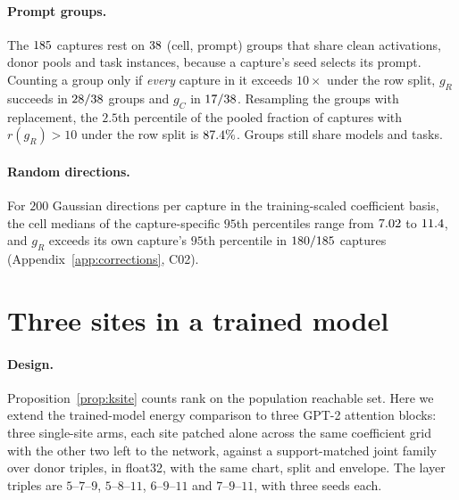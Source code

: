 \paragraph{Prompt groups.} The $185$ captures rest on $38$ (cell, prompt) groups that share clean
activations, donor pools and task instances, because a capture's seed selects its prompt. Counting a group only if \emph{every} capture in it exceeds
$10\times$ under the row split, $g_R$ succeeds in $28/38$ groups and $g_C$ in $17/38$.
Resampling the groups with replacement, the $2.5$th percentile of the pooled fraction of captures with
$r(g_R)>10$ under the row split is $87.4\%$. Groups still share models and tasks.

\paragraph{Random directions.} For $200$ Gaussian directions per capture in the training-scaled coefficient basis, the
cell medians of the capture-specific $95$th percentiles range from $7.02$ to $11.4$, and $g_R$
exceeds its own capture's $95$th percentile in $180/185$ captures (Appendix~\ref{app:corrections}, C02).

\section{Three sites in a trained model}
\label{app:three}

\paragraph{Design.} Proposition~\ref{prop:ksite} counts rank on the population reachable set. Here we extend the
trained-model energy comparison to three GPT-2 attention blocks: three single-site arms, each site patched alone across the same
coefficient grid with the other two left to the network, against a support-matched joint family over donor triples,
in float32, with the same chart, split and envelope. The layer triples are $5$--$7$--$9$, $5$--$8$--$11$,
$6$--$9$--$11$ and $7$--$9$--$11$, with three seeds each.

